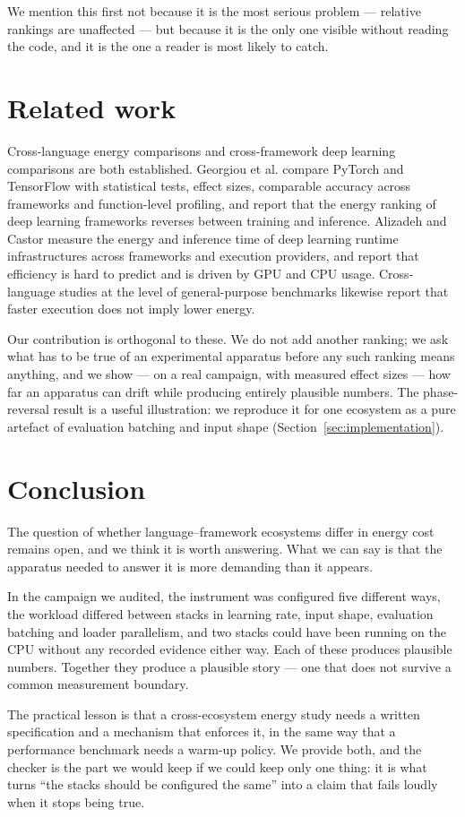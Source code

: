 \documentclass[11pt,a4paper]{article}
\begin{document}
We mention this first not because it is the most serious problem --- relative
rankings are unaffected --- but because it is the only one visible without
reading the code, and it is the one a reader is most likely to catch.








\section{Related work}
\label{sec:related}

Cross-language energy comparisons and cross-framework deep learning comparisons
are both established. Georgiou et al. compare PyTorch and TensorFlow with
statistical tests, effect sizes, comparable accuracy across frameworks and
function-level profiling, and report that the energy ranking of deep learning
frameworks reverses between training and inference. Alizadeh and Castor measure
the energy and inference time of deep learning runtime infrastructures across
frameworks and execution providers, and report that efficiency is hard to predict
and is driven by GPU and CPU usage. Cross-language studies at the level of
general-purpose benchmarks likewise report that faster execution does not imply
lower energy.

Our contribution is orthogonal to these. We do not add another ranking; we ask
what has to be true of an experimental apparatus before any such ranking means
anything, and we show --- on a real campaign, with measured effect sizes --- how
far an apparatus can drift while producing entirely plausible numbers. The
phase-reversal result is a useful illustration: we reproduce it for one ecosystem
as a pure artefact of evaluation batching and input shape
(Section~\ref{sec:implementation}).

\section{Conclusion}
\label{sec:conclusion}

The question of whether language--framework ecosystems differ in energy cost
remains open, and we think it is worth answering. What we can say is that the
apparatus needed to answer it is more demanding than it appears.

In the campaign we audited, the instrument was configured five different ways,
the workload differed between stacks in learning rate, input shape, evaluation
batching and loader parallelism, and two stacks could have been running on the
CPU without any recorded evidence either way. Each of these produces plausible
numbers. Together they produce a plausible story --- one that does not survive a
common measurement boundary.

The practical lesson is that a cross-ecosystem energy study needs a written
specification and a mechanism that enforces it, in the same way that a
performance benchmark needs a warm-up policy. We provide both, and the checker is
the part we would keep if we could keep only one thing: it is what turns
``the stacks should be configured the same'' into a claim that fails loudly when
it stops being true.
\end{document}
